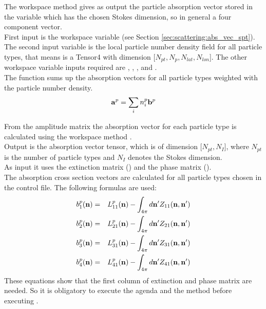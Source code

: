 \label{sec:scattering:abs_vec_part}

The workspace method  gives as output the
particle absorption vector  stored in the variable
 which has the chosen Stokes dimension, so in
general a four component vector.\\
First input is the workspace variable  (see Section
\ref{sec:scattering:abs_vec_spt}). The second input variable is the
local particle number density field  for all particle types,
that means  is a Tensor4 with dimension 
[$N_{pt}, N_{p}, N_{lat}, N_{lon}$]. The other workspace variable
inputs required are , ,
, and . \\  
The function sums up the absorption vectors for all particle types
weighted with the particle number density.
\begin{eqnarray}
  {\bf a}^{p} = \sum_i n^p_i {\bf b}^{p}
\end{eqnarray}


\label{sec:scattering:abs_vec_gas}


\label{sec:scattering:abs_vec_spt}

From the amplitude matrix the absorption vector for each
particle type is calculated using the workspace method
.\\
Output is the absorption vector tensor, which is  of  dimension
[$N_{pt}, N_{I}$], where $N_{pt}$ is the number of particle
types  and $N_{I}$ denotes the Stokes dimension.\\
As input it uses the extinction
matrix () and the phase matrix
().\\
The absorption cross section vectors \SAbVec{} are
calculated for all particle types chosen in the control
file. The following formulas are used:
\begin{eqnarray}
  \label{eq:gen_abs_vector}
  b^p_1({\bf n}) &=&  L^p_{11}({\bf n}) - \int_{4\pi} d{\bf n'}
  Z_{11}({\bf n, n'})\\
  b^p_2({\bf n}) &=&  L^p_{21}({\bf n}) - \int_{4\pi} d{\bf n'}
  Z_{21}({\bf n, n'})\\
  b^p_3({\bf n}) &=&  L^p_{31}({\bf n}) - \int_{4\pi} d{\bf n'}
  Z_{31}({\bf n, n'})\\
  b^p_4({\bf n}) &=&  L^p_{41}({\bf n}) - \int_{4\pi} d{\bf n'}
  Z_{41}({\bf n, n'}) \\
\end{eqnarray}
These equations show that the first column of extinction and phase
matrix are needed. So it is obligatory to execute the agenda
 and the method
 before executing
. 


